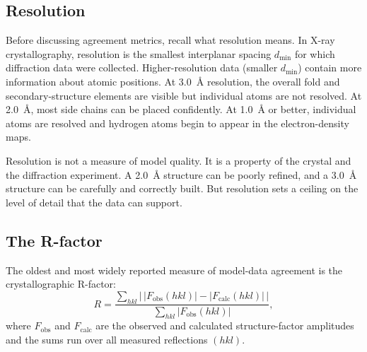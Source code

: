 \subsection{Resolution}
\label{sec:resolution}

Before discussing agreement metrics, recall what resolution
means. In X-ray crystallography, resolution is the smallest interplanar
spacing $d_{\min}$ for which diffraction data were collected.
Higher-resolution data (smaller $d_{\min}$) contain more information about
atomic positions. At 3.0~{\AA} resolution, the overall fold and
secondary-structure elements are visible but individual atoms are not
resolved. At 2.0~{\AA}, most side chains can be placed confidently.
At 1.0~{\AA} or better, individual atoms are resolved and hydrogen
atoms begin to appear in the electron-density maps.

Resolution is not a measure of model quality. It is a property of the
crystal and the diffraction experiment. A 2.0~{\AA} structure can be
poorly refined, and a 3.0~{\AA} structure can be carefully and
correctly built. But resolution sets a ceiling on the level of
detail that the data can support.

\subsection{The R-factor}
\label{sec:rfactor}

The oldest and most widely reported measure of model-data agreement is
the crystallographic R-factor:
\begin{equation}
\label{eq:rfactor-refinement}
  R = \frac{\displaystyle\sum_{hkl} \bigl|\, |F_{\mathrm{obs}}(hkl)| - |F_{\mathrm{calc}}(hkl)|\, \bigr|}
           {\displaystyle\sum_{hkl} |F_{\mathrm{obs}}(hkl)|},
\end{equation}
where $F_{\mathrm{obs}}$ and $F_{\mathrm{calc}}$ are the observed and
calculated structure-factor amplitudes and the sums run over all
measured reflections $(hkl)$.

